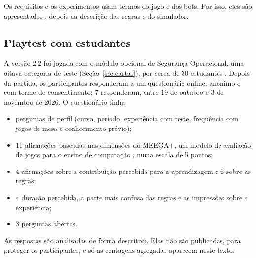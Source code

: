 Os requisitos e os experimentos usam termos do jogo e dos bots. Por isso, eles são apresentados , depois da descrição das regras e do simulador.

\subsection{Playtest com estudantes}

A versão 2.2 foi jogada com o módulo opcional de Segurança Operacional, uma oitava categoria de teste
(Seção~\ref{sec:cartas}), por cerca de 30 estudantes . Depois da partida, os participantes responderam a um questionário online, anônimo e com
termo de consentimento; 7 responderam, entre 19 de outubro e 3 de novembro de 2026. 
O questionário tinha:
\begin{itemize}
  \item perguntas de perfil (curso, período, experiência com teste, frequência com jogos de mesa e
    conhecimento prévio);
  \item 11 afirmações baseadas nas dimensões do MEEGA+, um modelo de avaliação de jogos para o ensino de
    computação \cite{petri2017meega}, numa escala de 5 pontos;
  \item 4 afirmações sobre a contribuição percebida para a aprendizagem e 6 sobre as regras;
  \item a duração percebida, a parte mais confusa das regras e as impressões sobre a experiência;
  \item 3 perguntas abertas.
\end{itemize}
 As respostas
são analisadas de forma descritiva. Elas não são publicadas, para proteger os participantes, e só as contagens
agregadas aparecem neste texto.


